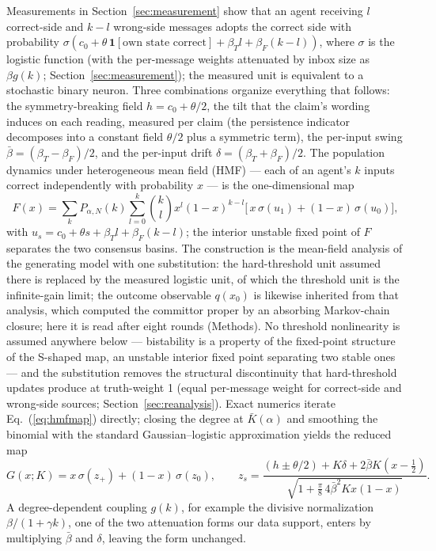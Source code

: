 \documentclass[11pt]{article}
\begin{document}
Measurements in Section~\ref{sec:measurement} show that an agent receiving $l$
correct-side and $k-l$ wrong-side messages adopts the correct side with
probability
$\sigma(c_0 + \theta\,\mathbf{1}[\text{own state correct}] + \beta_T l +
\beta_F (k-l))$, where $\sigma$ is the logistic function (with the per-message weights attenuated by inbox size as $\beta g(k)$; Section~\ref{sec:measurement}); the measured unit is equivalent to a stochastic binary neuron. Three combinations
organize everything that follows: the symmetry-breaking field
$h = c_0 + \theta/2$, the tilt that the claim's wording induces on each
reading, measured per claim (the persistence indicator decomposes into a
constant field $\theta/2$ plus a symmetric term), the per-input swing
$\bar\beta = (\beta_T - \beta_F)/2$, and the per-input drift
$\delta = (\beta_T + \beta_F)/2$.
The population dynamics under heterogeneous mean field (HMF) --- each of an
agent's $k$ inputs correct independently with probability $x$ --- is the
one-dimensional map
\begin{equation}
F(x) = \sum_{k} P_{\alpha,N}(k) \sum_{l=0}^{k} \binom{k}{l}
x^{l} (1-x)^{k-l} \bigl[\, x\,\sigma(u_{1}) + (1-x)\,\sigma(u_{0})
\bigr],
\label{eq:hmfmap}
\end{equation}
with $u_{s} = c_0 + \theta s + \beta_T l + \beta_F (k-l)$; the interior
unstable fixed point of $F$ separates the two consensus basins. The
construction is the mean-field analysis of the generating model
\citep{SciRepCrowding} with one substitution: the hard-threshold unit
assumed there is replaced by the measured logistic unit, of which the
threshold unit is the infinite-gain limit; the outcome observable
$q(x_0)$ is likewise inherited from that analysis, which computed the
committor proper by an absorbing Markov-chain closure; here it is read after
eight rounds (Methods). No threshold
nonlinearity is assumed anywhere below --- bistability is a property of the
fixed-point structure of the S-shaped map, an unstable interior fixed point
separating two stable ones --- and the substitution
removes the structural discontinuity that hard-threshold updates produce at truth-weight 1 (equal per-message weight for correct-side and wrong-side sources; Section~\ref{sec:reanalysis}). Exact numerics iterate
Eq.~(\ref{eq:hmfmap}) directly; closing the degree at $\bar K(\alpha)$ and
smoothing the binomial with the standard Gaussian--logistic approximation
yields the reduced map
\begin{equation}
G(x;K) = x\,\sigma(z_+) + (1-x)\,\sigma(z_0), \qquad
z_s = \frac{(h \pm \theta/2) + K\delta + 2\bar\beta K (x - \tfrac12)}
{\sqrt{1 + \tfrac{\pi}{8}\, 4\bar\beta^2 K x(1-x)}}.
\end{equation}
A degree-dependent coupling $g(k)$, for example the divisive normalization
$\beta/(1+\gamma k)$, one of the two attenuation forms our data support,
enters by multiplying $\bar\beta$ and $\delta$, leaving the form unchanged.
\end{document}
